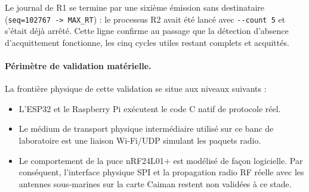 Le journal de R1 se termine par une sixième émission sans destinataire (\texttt{seq=102767 -> MAX\_RT}) : le processus R2 avait été lancé avec \texttt{-{}-count 5} et s'était déjà arrêté. Cette ligne confirme au passage que la détection d'absence d'acquittement fonctionne, les cinq cycles utiles restant complets et acquittés.

\paragraph{Périmètre de validation matérielle.}
La frontière physique de cette validation se situe aux niveaux suivants :
\begin{itemize}
  \item L'ESP32 et le Raspberry Pi exécutent le code C natif de protocole réel.
  \item Le médium de transport physique intermédiaire utilisé sur ce banc de laboratoire est une liaison Wi-Fi/UDP simulant les paquets radio.
  \item Le comportement de la puce nRF24L01+ est modélisé de façon logicielle. Par conséquent, l'interface physique SPI et la propagation radio RF réelle avec les antennes sous-marines sur la carte Caiman restent non validées à ce stade.
\end{itemize}
